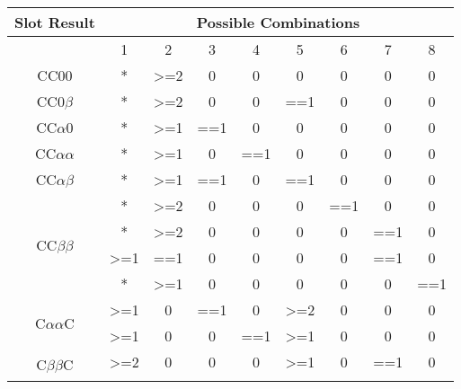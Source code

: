 \documentclass[fleqn]{article}
\begin{document}
\begin{table}[]
\centering
\begin{tabular}{|c|c|c|c|c|c|c|c|c|}
\hline
Slot Result                         & \multicolumn{8}{c|}{Possible Combinations}                                                        \\ \hline
                                    & 1                & 2                & 3   & 4   & 5                & 6                & 7   & 8   \\ \hline
CC00                                & *                & \textgreater{}=2 & 0   & 0   & 0                & 0                & 0   & 0   \\ \hline
CC0$\beta$                          & *                & \textgreater{}=2 & 0   & 0   & ==1              & 0                & 0   & 0   \\ \hline
CC$\alpha$0                         & *                & \textgreater{}=1 & ==1 & 0   & 0                & 0                & 0   & 0   \\ \hline
CC$\alpha$$\alpha$                  & *                & \textgreater{}=1 & 0   & ==1 & 0                & 0                & 0   & 0   \\ \hline
CC$\alpha$$\beta$                   & *                & \textgreater{}=1 & ==1 & 0   & ==1              & 0                & 0   & 0   \\ \hline
\multirow{4}{*}{CC$\beta$$\beta$}   & *                & \textgreater{}=2 & 0   & 0   & 0                & ==1              & 0   & 0   \\ \cline{2-9} 
                                    & *                & \textgreater{}=2 & 0   & 0   & 0                & 0                & ==1 & 0   \\ \cline{2-9} 
                                    & \textgreater{}=1 & ==1              & 0   & 0   & 0                & 0                & ==1 & 0   \\ \cline{2-9} 
                                    & *                & \textgreater{}=1 & 0   & 0   & 0                & 0                & 0   & ==1 \\ \hline
\multirow{2}{*}{C$\alpha$$\alpha$C} & \textgreater{}=1 & 0                & ==1 & 0   & \textgreater{}=2 & 0                & 0   & 0   \\ \cline{2-9} 
                                    & \textgreater{}=1 & 0                & 0   & ==1 & \textgreater{}=1 & 0                & 0   & 0   \\ \hline
\multirow{2}{*}{C$\beta$$\beta$C}   & \textgreater{}=2 & 0                & 0   & 0   & \textgreater{}=1 & 0                & ==1 & 0   \\ \cline{2-9} 

\end{tabular}
\end{table}
\end{document}
